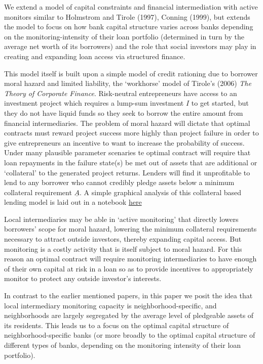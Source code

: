 \documentclass[11pt]{article}
\begin{document}
    We extend a model of capital constraints and financial intermediation
with active monitors similar to Holmstrom and Tirole (1997), Conning
(1999), but extends the model to focus on how bank capital structure
varies across banks depending on the monitoring-intensity of their loan
portfolio (determined in turn by the average net worth of its borrowers)
and the role that social investors may play in creating and expanding
loan access via structured finance.

This model itself is built upon a simple model of credit rationing due
to borrower moral hazard and limited liability, the `workhorse' model of
Tirole's (2006) \emph{The Theory of Corporate Finance}. Risk-neutral
entrepreneurs have access to an investment project which requires a
lump-sum investment \(I\) to get started, but they do not have liquid
funds so they seek to borrow the entire amount from financial
intermediaries. The problem of moral hazard will dictate that optimal
contracts must reward project success more highly than project failure
in order to give entrepreneurs an incentive to want to increase the
probability of success. Under many plausible parameter scenaries te
optimal contract will require that loan repayments in the failure
state(s) be met out of assets that are additional or `collateral' to the
generated project returns. Lenders will find it unprofitable to lend to
any borrower who cannot credibly pledge assets below a minimum
collateral requirement \(\underline A\). A simple graphical analysis of
this collateral based lending model is laid out in a notebook
\href{basicmodel.ipynb}{here}

Local intermediaries may be able in `active monitoring' that directly
lowers borrowers' scope for moral hazard, lowering the minimum
collateral requirements necessary to attract outside investors, thereby
expanding capital access. But monitoring is a costly activity that is
itself subject to moral hazard. For this reason an optimal contract will
require monitoring intermediaries to have enough of their own capital at
risk in a loan so as to provide incentives to appropriately monitor to
protect any outside investor's interests.

In contrast to the earlier mentioned papers, in this paper we posit the
idea that local intermediary monitoring capacity is
neighborhood-specific, and neighborhoods are largely segregated by the
average level of pledgeable assets of its residents. This leads us to a
focus on the optimal capital structure of neighborhood-specific banks
(or more broadly to the optimal capital structure of different types of
banks, depending on the monitoring intensity of their loan portfolio).
\end{document}
